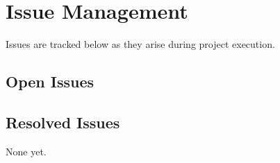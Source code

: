 \documentclass[letterpaper,10pt,openany,oneside,english]{sphinxmanual}
\begin{document}
\sphinxstepscope


\section{Issue Management}
\label{\detokenize{issue_management:issue-management}}\label{\detokenize{issue_management::doc}}
\sphinxAtStartPar
Issues are tracked below as they arise during project execution.


\subsection{Open Issues}
\label{\detokenize{issue_management:open-issues}}

\subsection{Resolved Issues}
\label{\detokenize{issue_management:resolved-issues}}
\sphinxAtStartPar
None yet.


\section{}
\label{\detokenize{index:document-author-s}}
\sphinxAtStartPar
{}



\renewcommand{\indexname}{Index}
\printindex
\end{document}
